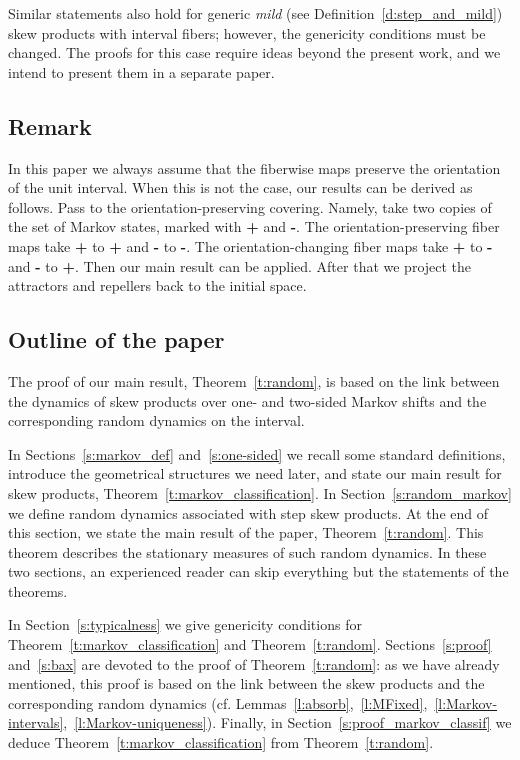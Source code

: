 \documentclass[a4paper,12pt]{amsart}
\begin{document}
Similar statements also hold for generic \emph{mild} (see Definition~\ref{d:step_and_mild}) skew products with interval fibers; however, the genericity conditions must be changed. The proofs for this case require ideas beyond the present work, and we intend to present them in a separate paper.




\subsection{Remark}

In this paper we always assume that the fiberwise maps preserve the orientation of the unit interval. When this is not the case, our results can be derived as follows. Pass to the orientation-preserving covering. Namely, take two copies of the set of Markov states, marked with \textbf{+} and \textbf{-}. The orientation-preserving fiber maps take \textbf{+} to \textbf{+} and \textbf{-} to \textbf{-}. The orientation-changing fiber maps take \textbf{+} to \textbf{-} and \textbf{-} to \textbf{+}. Then our main result can be applied. After that we project the attractors and repellers back to the initial space.


\subsection{Outline of the paper}
The proof of our main result, Theorem~\ref{t:random}, is based on the link between the dynamics of skew products over one- and two-sided Markov shifts and the corresponding random dynamics on the interval.

In Sections~\ref{s:markov_def} and~\ref{s:one-sided} we recall some standard definitions, introduce the geometrical structures we need later, and state our main result for skew products, Theorem~\ref{t:markov_classification}. In Section~\ref{s:random_markov} we define random dynamics associated with step skew products. At the end of this section, we state the main result of the paper, Theorem~\ref{t:random}. This theorem describes the stationary measures of such random dynamics. In these two sections, an experienced reader can skip everything but the statements of the theorems.

In Section~\ref{s:typicalness} we give genericity conditions for Theorem~\ref{t:markov_classification} and Theorem~\ref{t:random}. Sections~\ref{s:proof} and~\ref{s:bax} are devoted to the proof of Theorem~\ref{t:random}: as we have already mentioned, this proof is based on the link between the skew products and the corresponding random dynamics (cf. Lemmas~\ref{l:absorb},~\ref{l:MFixed},~\ref{l:Markov-intervals},~\ref{l:Markov-uniqueness}). Finally, in Section~\ref{s:proof_markov_classif} we deduce Theorem~\ref{t:markov_classification} from Theorem~\ref{t:random}.
\end{document}
